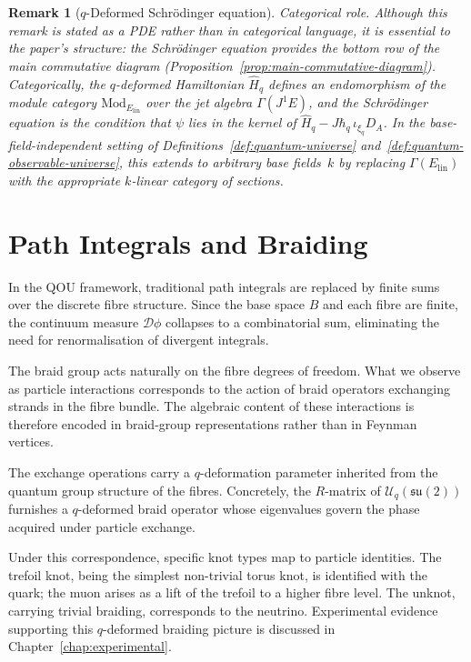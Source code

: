 \documentclass[12pt,a4paper]{report}
\newtheorem{remark}[theorem]{Remark}
\begin{document}
\begin{remark}[$q$-Deformed Schr\"odinger equation]
\medskip\noindent\textit{Categorical role.}\;
Although this remark is stated as a PDE rather than in categorical language,
it is essential to the paper's structure: the Schr\"odinger equation
provides the bottom row of the main commutative diagram
(Proposition~\ref{prop:main-commutative-diagram}).  Categorically, the
$q$-deformed Hamiltonian $\hat{H}_q$ defines an endomorphism of the
module category $\mathrm{Mod}_{E_{\mathrm{lin}}}$ over the jet algebra
$\Gamma(J^1 E)$, and the Schr\"odinger equation is the condition that
$\psi$ lies in the kernel of $\hat{H}_q - J\hbar_q\,\iota_{\xi_q}D_A$.
In the base-field-independent setting of
Definitions~\ref{def:quantum-universe}
and~\ref{def:quantum-observable-universe}, this extends to arbitrary base
fields~$k$ by replacing $\Gamma(E_{\mathrm{lin}})$ with the appropriate
$k$-linear category of sections.
\end{remark}

 \chapter{Path Integrals and Braiding}
\label{chap:path-integrals-braiding}

In the QOU framework, traditional path integrals are replaced by finite sums
over the discrete fibre structure.  Since the base space $B$ and each fibre are
finite, the continuum measure $\mathcal{D}\phi$ collapses to a combinatorial
sum, eliminating the need for renormalisation of divergent integrals.

The braid group acts naturally on the fibre degrees of freedom.  What we
observe as particle interactions corresponds to the action of braid operators
exchanging strands in the fibre bundle.  The algebraic content of these
interactions is therefore encoded in braid-group representations rather than in
Feynman vertices.

The exchange operations carry a $q$-deformation parameter inherited from the
quantum group structure of the fibres.  Concretely, the $R$-matrix of
$\mathcal{U}_q(\mathfrak{su}(2))$ furnishes a $q$-deformed braid operator
whose eigenvalues govern the phase acquired under particle exchange.

Under this correspondence, specific knot types map to particle identities.  The
trefoil knot, being the simplest non-trivial torus knot, is identified with the
quark; the muon arises as a lift of the trefoil to a higher fibre level.  The
unknot, carrying trivial braiding, corresponds to the neutrino.
Experimental evidence supporting this $q$-deformed braiding picture is
discussed in Chapter~\ref{chap:experimental}.
\end{document}
